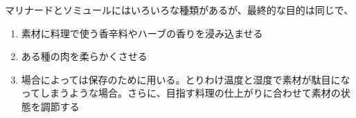 
 

\vspace{1\zw}

マリナードとソミュールにはいろいろな種類があるが、最終的な目的は同じで、

\begin{enumerate}
\def\labelenumi{\arabic{enumi}.}
\item
  素材に料理で使う香辛料やハーブの香りを浸み込ませる
\item
  ある種の肉を柔らかくさせる
\item
  場合によっては保存のために用いる。とりわけ温度と湿度で素材が駄目になってしまうような場合。さらに、目指す料理の仕上がりに合わせて素材の状態を調節する
\end{enumerate}
